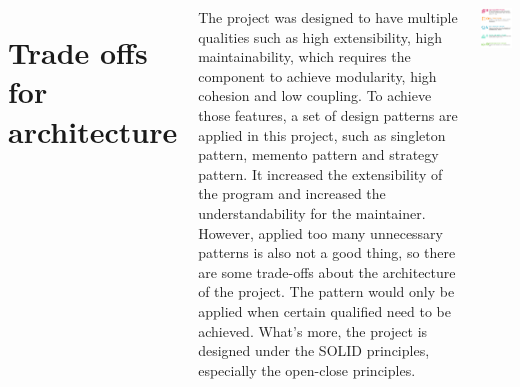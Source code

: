 \documentclass[20pt,margin=1in,innermargin=-4.5in,blockverticalspace=-0.25in]{tikzposter}
\begin{document}
\begin{columns}
{    \section{ Trade offs for architecture }
    
 The project was designed to have multiple qualities such as high extensibility, high maintainability, which requires the component to achieve modularity, high cohesion and low coupling. To achieve those features, a set of design patterns are applied in this project, such as singleton pattern, memento pattern and strategy pattern. It increased the extensibility of the program and increased the understandability for the maintainer. However, applied too many unnecessary patterns is also not a good thing, so there are some trade-offs about the architecture of the project. The pattern would only be applied when certain qualified need to be achieved. What's more, the project is designed under the SOLID principles, especially the open-close principles. 
               \begin{tikzfigure}
            \includegraphics[width=0.5\linewidth]{assets/solid-principle.png}
        \end{tikzfigure}
       }
\end{columns}
\end{document}
